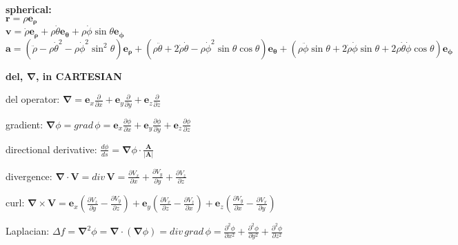 \documentclass[letterpaper,landscape,10pt]{article}
\newenvironment{mydescription}
{\begin{description}
	\setlength{\itemsep}{0pt}
	\setlength{\parskip}{0pt}
	\setlength{\parsep}{-1pt}}
{\end{description}}
\begin{document}
{\begin{multicols}{3}
	\textbf{spherical:}\\
	$\bm{\mathbf{r}} = \rho \bm{\mathbf{e}_\rho}$\\
	$\bm{\mathbf v} = \dot \rho \bm{\mathbf{e}_\rho} + \rho\dot \theta \bm{\mathbf{e}_\theta} +
		\rho \dot\phi\sin\theta\bm{\mathbf{e}_\phi}$\\
	$\bm{\mathbf{a}} = \left( \ddot \rho -
		\rho\dot\theta^2-\rho\dot\phi^2\sin^2\theta\right)\bm{\mathbf{e}_\rho} +
		\left(\rho\ddot\theta+2\dot \rho \dot\theta -
		\rho\dot\phi^2\sin\theta\cos\theta\right)\bm{\mathbf{e}_\theta} + \left(
		\rho\ddot\phi\sin\theta+2\dot \rho\dot\phi\sin\theta +
		2\rho\dot\theta\dot\phi\cos\theta\right)\bm{\mathbf{e}_\phi}$
	\begin{center}\textbf{del, $\mathbf{\nabla}$, in CARTESIAN}\end{center}
		\begin{mydescription}
			\item[del operator:]
				$\mathbf{\nabla} =
				\mathbf{e}_x \frac{\partial}{\partial x} +
				\mathbf{e}_y\frac{\partial}{\partial y} + 
				\mathbf{e}_z\frac{\partial}{\partial z}$  
			\item[gradient:]
				$\mathbf{\nabla}\phi =
				grad\,\phi =
				\mathbf{e}_x\frac{\partial\phi}{\partial x} +
				\mathbf{e}_y\frac{\partial\phi}{\partial y} +
				\mathbf{e}_z\frac{\partial\phi}{\partial z}$  
			\item[directional derivative:]
				$\frac{d\phi}{ds} =
					\mathbf{\nabla}\phi \cdot \frac{\mathbf{A}}{|\mathbf{A}|}$  
			\item[divergence:]
				$\mathbf{\nabla}\cdot\mathbf{V} =
				div\, \mathbf{V} =
					\frac{\partial V_x}{\partial x} +
					\frac{\partial V_y}{\partial y} +
					\frac{\partial V_z}{\partial z}$  
			\item[curl:]
				$\mathbf{\nabla}\times \mathbf{V} =
				\mathbf{e}_x\left(\frac{\partial V_z}{\partial y} -
					\frac{\partial V_y}{\partial z}\right) +
					\mathbf{e}_y \left( \frac{\partial V_x}{\partial z} -
					\frac{\partial V_z}{\partial x}\right) +
					\mathbf{e}_z \left( \frac{\partial V_y}{\partial x} -
					\frac{\partial V_x}{\partial y} \right) $  
			\item[Laplacian:]
				$\Delta f = \mathbf{\nabla}^2\phi =
				\mathbf{\nabla} \cdot (\mathbf{\nabla}\phi) = div\, grad\, \phi =
					\frac{\partial^2 \phi}{\partial x^2} +
					\frac{\partial^2 \phi}{\partial y^2} +
					\frac{\partial^2 \phi}{\partial z^2}$ 
		\end{mydescription}


\end{multicols}}
\end{document}
